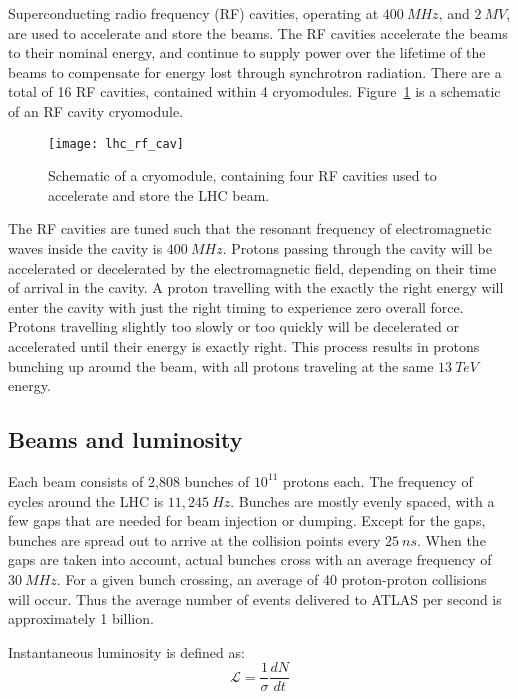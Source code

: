 Superconducting radio frequency (RF) cavities, operating at $400~MHz$, and $2~MV$, are used to accelerate and store the beams.
The RF cavities accelerate the beams to their nominal energy,
and continue to supply power over the lifetime of the beams to compensate for energy lost through synchrotron radiation.
There are a total of 16 RF cavities, contained within 4 cryomodules.
Figure~\ref{fig:rf_cryo} is a schematic of an RF cavity cryomodule.

\begin{figure}[!ht]\centering
\texttt{[image: lhc\_rf\_cav]}
\caption{Schematic of a cryomodule, containing four RF cavities used to accelerate and store the LHC beam.}
\label{fig:rf_cryo}\cite{lhc-machine-2008}
\end{figure}

The RF cavities are tuned such that the resonant frequency of electromagnetic waves inside the cavity is $400~MHz$.
Protons passing through the cavity will be accelerated or decelerated by the electromagnetic field,
depending on their time of arrival in the cavity.
A proton travelling with the exactly the right energy will enter the cavity with just the right timing to experience zero overall force.
Protons travelling slightly too slowly or too quickly will be decelerated or accelerated until their energy is exactly right.
This process results in protons bunching up around the beam, with all protons traveling at the same $13~TeV$ energy.

\subsection{Beams and luminosity}\label{subsec:lhc_beam}

Each beam consists of 2,808 bunches of $10^{11}$ protons each.
The frequency of cycles around the LHC is $11,245~Hz$.
Bunches are mostly evenly spaced, with a few gaps that are needed for beam injection or dumping.
Except for the gaps, bunches are spread out to arrive at the collision points every $25~ns$.
When the gaps are taken into account, actual bunches cross with an average frequency of $30~MHz$.
For a given bunch crossing, an average of 40 proton-proton collisions will occur.
Thus the average number of events delivered to ATLAS per second is approximately 1 billion.\cite{lhc-guide-2017}

Instantaneous luminosity is defined as:
\begin{equation}
\mathcal{L} = \frac{1}{\sigma}\frac{dN}{dt}
\end{equation}

